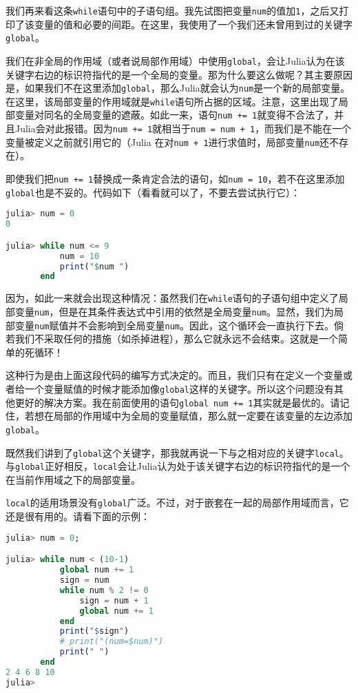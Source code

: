 我们再来看这条\verb|while|语句中的子语句组。我先试图把变量\verb|num|的值加\verb|1|，之后又打印了该变量的值和必要的间距。在这里，我使用了一个我们还未曾用到过的关键字\verb|global|。

我们在非全局的作用域（或者说局部作用域）中使用\verb|global|，会让Julia认为在该关键字右边的标识符指代的是一个全局的变量。那为什么要这么做呢？其主要原因是，如果我们不在这里添加\verb|global|，那么Julia就会认为\verb|num|是一个新的局部变量。在这里，该局部变量的作用域就是\verb|while|语句所占据的区域。注意，这里出现了局部变量对同名的全局变量的遮蔽。如此一来，语句\verb|num += 1|就变得不合法了，并且Julia会对此报错。因为\verb|num += 1|就相当于\verb|num = num + 1|，而我们是不能在一个变量被定义之前就引用它的（Julia 在对\verb|num + 1|进行求值时，局部变量\verb|num|还不存在）。

即使我们把\verb|num += 1|替换成一条肯定合法的语句，如\verb|num = 10|，若不在这里添加\verb|global|也是不妥的。代码如下（看看就可以了，不要去尝试执行它）：

\begin{lstlisting}[language=julia]
julia> num = 0
0

julia> while num <= 9 
           num = 10 
           print("$num ") 
       end
\end{lstlisting}

因为，如此一来就会出现这种情况：虽然我们在\verb|while|语句的子语句组中定义了局部变量\verb|num|，但是在其条件表达式中引用的依然是全局变量\verb|num|。显然，我们为局部变量\verb|num|赋值并不会影响到全局变量\verb|num|。因此，这个循环会一直执行下去。倘若我们不采取任何的措施（如杀掉进程），那么它就永远不会结束。这就是一个简单的死循环！

这种行为是由上面这段代码的编写方式决定的。而且，我们只有在定义一个变量或者给一个变量赋值的时候才能添加像\verb|global|这样的关键字。所以这个问题没有其他更好的解决方案。我在前面使用的语句\verb|global num += 1|其实就是最优的。请记住，若想在局部的作用域中为全局的变量赋值，那么就一定要在该变量的左边添加\verb|global|。

既然我们讲到了\verb|global|这个关键字，那我就再说一下与之相对应的关键字\verb|local|。与\verb|global|正好相反，\verb|local|会让Julia认为处于该关键字右边的标识符指代的是一个在当前作用域之下的局部变量。

\verb|local|的适用场景没有\verb|global|广泛。不过，对于嵌套在一起的局部作用域而言，它还是很有用的。请看下面的示例：

\begin{lstlisting}[language=julia]
julia> num = 0;

julia> while num < (10-1) 
           global num += 1
           sign = num
           while num % 2 != 0
               sign = num + 1
               global num += 1
           end
           print("$sign")
           # print("(num=$num)")
           print(" ")
       end
2 4 6 8 10 
julia> 
\end{lstlisting}

